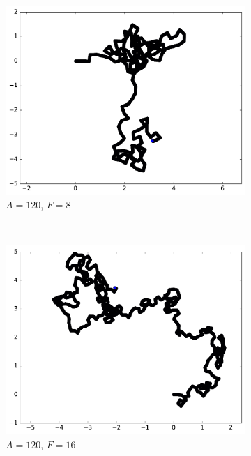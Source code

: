 \begin{figure}[htb]
\begin{subfigure}[t]{\subImgWmo}
			\includegraphics[width=\textwidth]{figures/ch3/synTraj_219_120_8}
			\caption[$A = 120$, $F=8$]{$A = 120$, $F=8$}
			\label{fig:synTraj_219_120_8}
		\end{subfigure}
		~
		\begin{subfigure}[t]{\subImgWmo}
			\centering
			\includegraphics[width=\textwidth]{figures/ch3/synTraj_219_120_16}
			\caption[$A = 120$, $F=16$]{$A = 120$, $F=16$}
			\label{fig:synTraj_219_120_16}
		\end{subfigure}
		~
		\begin{subfigure}[t]{\subImgWmo}
			\centering

\end{subfigure}
\end{figure}
